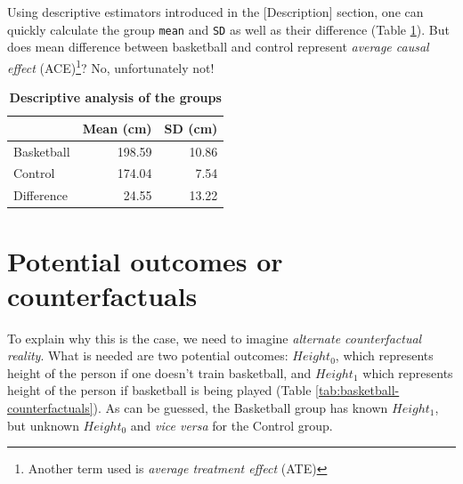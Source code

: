 \documentclass[
]{book}
\begin{document}
Using descriptive estimators introduced in the {[}Description{]} section, one can quickly calculate the group \texttt{mean} and \texttt{SD} as well as their difference (Table \ref{tab:descriptive-group-analysis}). But does mean difference between basketball and control represent \emph{average causal effect} (ACE)\footnote{Another term used is \emph{average treatment effect} (ATE)}? No, unfortunately not!



\begin{table}

\caption{\label{tab:descriptive-group-analysis}\textbf{Descriptive analysis of the groups}}
\centering
\begin{tabular}[t]{lrr}
\toprule
 & Mean (cm) & SD (cm)\\
\midrule
Basketball & 198.59 & 10.86\\
Control & 174.04 & 7.54\\
Difference & 24.55 & 13.22\\
\bottomrule
\end{tabular}
\end{table}

\hypertarget{potential-outcomes-or-counterfactuals}{%
\section{Potential outcomes or counterfactuals}\label{potential-outcomes-or-counterfactuals}}

To explain why this is the case, we need to imagine \emph{alternate counterfactual reality}. What is needed are two potential outcomes: \(Height_{0}\), which represents height of the person if one doesn't train basketball, and \(Height_{1}\) which represents height of the person if basketball is being played (Table \ref{tab:basketball-counterfactuals}). As can be guessed, the Basketball group has known \(Height_{1}\), but unknown \(Height_{0}\) and \emph{vice versa} for the Control group.
\end{document}
